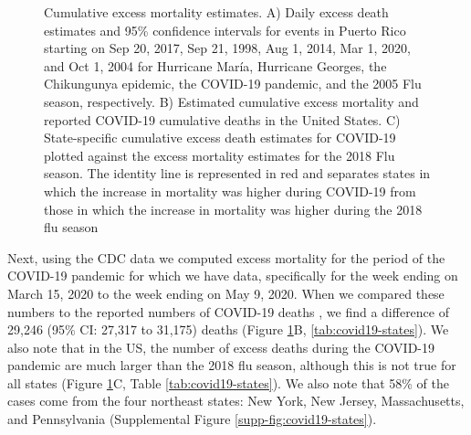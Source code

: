 \documentclass[11pt]{article}
\begin{document}
\begin{figure}[ht]
    \caption{Cumulative excess mortality estimates. A) Daily excess death estimates and 95\% confidence intervals for events in Puerto Rico starting on Sep 20, 2017, Sep 21, 1998, Aug 1, 2014, Mar 1, 2020, and Oct 1, 2004 for Hurricane Mar\'ia, Hurricane Georges, the Chikungunya epidemic, the COVID-19 pandemic, and the 2005 Flu season, respectively.  B) Estimated cumulative excess mortality and reported COVID-19 cumulative deaths in the United States. C) State-specific cumulative excess death estimates for COVID-19 plotted against the excess mortality estimates for the 2018 Flu season. The identity line is represented in red and separates states in which the increase in mortality was higher during COVID-19 from those in which the increase in mortality was higher during the 2018 flu season}
    \label{fig:excess-deaths}
\end{figure}

Next, using the CDC data we computed excess mortality for the period of the COVID-19 pandemic for which we have data, specifically for the week ending on March 15, 2020 to the week ending on May 9, 2020. When we compared these numbers to the reported numbers of COVID-19 deaths \cite{smith2020coronavirus}, we find a difference of 29,246 (95\% CI: 27,317 to 31,175) deaths (Figure \ref{fig:excess-deaths}B, \ref{tab:covid19-states}). We also note that in the US, the number of excess deaths during the COVID-19 pandemic are much larger than the 2018 flu season, although this is not true for all states (Figure \ref{fig:excess-deaths}C, Table \ref{tab:covid19-states}). We also note that 58\% of the cases come from the four northeast states: New York, New Jersey, Massachusetts, and Pennsylvania (Supplemental Figure \ref{supp-fig:covid19-states}).
\end{document}
